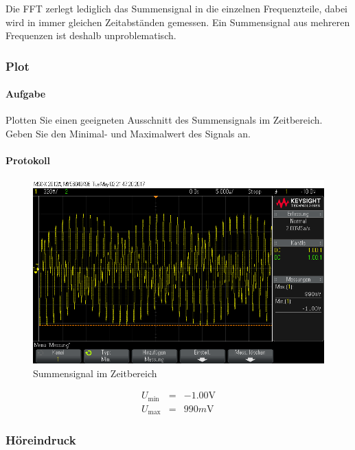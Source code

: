 \documentclass[10pt]{scrreprt}
\begin{document}
        Die FFT zerlegt lediglich das Summensignal in die einzelnen Frequenzteile,
        dabei wird in immer gleichen Zeitabständen gemessen. Ein Summensignal aus
        mehreren Frequenzen ist deshalb unproblematisch.

        \subsubsection{Plot}
        \paragraph{Aufgabe}
        Plotten Sie einen geeigneten Ausschnitt des Summensignals im Zeitbereich. Geben
        Sie den Minimal- und Maximalwert des Signals an.
        \paragraph{Protokoll}
        \begin{center}
            \begin{figure}[H]
                \includegraphics[width=\textwidth]{Screenshot_GUI_4202.png}
              \caption{Summensignal im Zeitbereich}
            \end{figure}
        \end{center}

        \begin{eqnarray*}
            U_{\min{}} &=& -1.00\si{\volt}\\
            U_{\max{}} &=& 990\si{m\volt}
        \end{eqnarray*}

        \subsubsection{Höreindruck}
\end{document}
